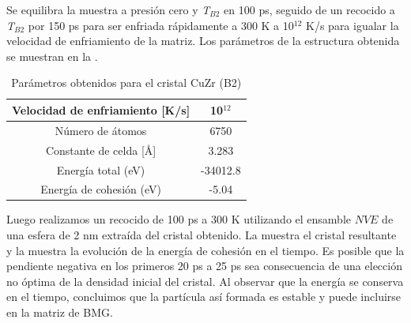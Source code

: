 Se equilibra la muestra a presión cero y \textit{T$_{B2}$} en 100 ps, seguido de un recocido a \textit{T$_{B2}$} por 150 ps para ser enfriada rápidamente a 300 K a 10$^{12}$ K/s para igualar la velocidad de enfriamiento de la matriz. Los parámetros de la estructura obtenida se muestran en la .

\begin{table}[htp]
\begin{center}
\begin{tabular}{*{2}{c}}
\hline
Velocidad de enfriamiento [K/s] & 10$^{12}$ \\
\hline
Número de átomos & 6750 \\
\hline
Constante de celda [\AA] & 3.283 \\
\hline
Energía total (eV) & -34012.8 \\
\hline
Energía de cohesión (eV) & -5.04 \\
\hline
\end{tabular}
\end{center}
\caption{Parámetros obtenidos para el cristal CuZr (B2)}
\label{C4:tb:b2CrystalParameters}
\end{table}

Luego realizamos un recocido de 100 ps a 300 K utilizando el ensamble $NVE$ de una esfera de 2 nm extraída del cristal obtenido. La  muestra el cristal resultante y la  muestra la evolución de la energía de cohesión en el tiempo. Es posible que la pendiente negativa en los primeros 20 ps a 25 ps sea consecuencia de una elección no óptima de la densidad inicial del cristal. Al observar que la energía se conserva en el tiempo, concluimos que la partícula así formada es estable y puede incluirse en la matriz de BMG.

